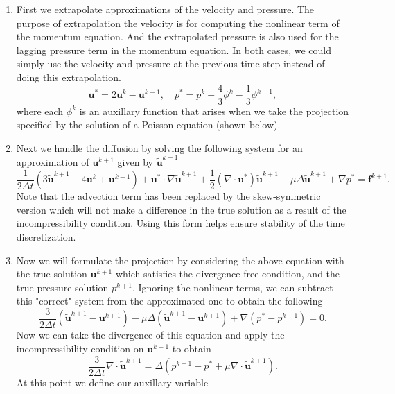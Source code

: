 \documentclass{article}
\begin{document}
   \begin{enumerate}
       \item First we extrapolate approximations of the velocity and pressure. The purpose of extrapolation the velocity is for computing the nonlinear term of the momentum equation. And the extrapolated pressure is also used for the lagging pressure term in the momentum equation. In both cases, we could simply use the velocity and pressure at the previous time step instead of doing this extrapolation. 
           \[
               \boldsymbol{u}^* = 2\boldsymbol{u}^k - \boldsymbol{u}^{k-1},\quad p^* = p^k + \frac{4}{3}\phi^k-\frac{1}{3}\phi^{k-1}, 
           \]
           where each $\phi^k$ is an auxillary function that arises when we take the projection specified by the solution of a Poisson equation (shown below).
       \item Next we handle the diffusion by solving the following system for an approximation of $\boldsymbol{u}^{k+1}$ given by $\tilde{\boldsymbol{u}}^{k+1}$ 
           \[
               \frac{1}{2\Delta t}(3\tilde{\boldsymbol{u}}^{k+1} - 4\boldsymbol{u}^k + \boldsymbol{u}^{k-1}) + \boldsymbol{u}^*\cdot \nabla \tilde{\boldsymbol{u}}^{k+1} + \frac{1}{2}(\nabla \cdot \boldsymbol{u}^*)\tilde{\boldsymbol{u}}^{k+1} -\mu \Delta \tilde{\boldsymbol{u}}^{k+1} + \nabla p^* = \boldsymbol{f}^{k+1}.
           \]
           Note that the advection term has been replaced by the skew-symmetric version which will not make a difference in the true solution as a result of the incompressibility condition. Using this form helps ensure stability of the time discretization. 
       \item Now we will formulate the projection by considering the above equation with the true solution $\boldsymbol{u}^{k+1}$ which satisfies the divergence-free condition, and the true pressure solution $p^{k+1}$. Ignoring the nonlinear terms, we can subtract this "correct" system from the approximated one to obtain the following
           \[
               \frac{3}{2\Delta t}(\tilde{\boldsymbol{u}}^{k+1} - \boldsymbol{u}^{k+1}) -\mu \Delta (\tilde{\boldsymbol{u}}^{k+1} - \boldsymbol{u}^{k+1}) + \nabla (p^* - p^{k+1}) = 0.
           \]
           Now we can take the divergence of this equation and apply the incompressibility condition on $\boldsymbol{u}^{k+1}$ to obtain
           \[
               \frac{3}{2\Delta t}\nabla \cdot \tilde{\boldsymbol{u}}^{k+1} = \Delta (p^{k+1} - p^* + \mu \nabla \cdot \tilde{\boldsymbol{u}}^{k+1}).
           \]
           At this point we define our auxillary variable

\end{enumerate}
\end{document}
